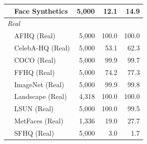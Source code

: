 \begin{table}[t]
\begin{tabular}{l l r r r}
  & Face Synthetics & 5,000 & 12.1 & 14.9 \\
\midrule
\multicolumn{5}{l}{\textit{Real}} \\
  & AFHQ (Real) & 5,000 & 100.0 & 100.0 \\
  & CelebA-HQ (Real) & 5,000 & 53.1 & 62.3 \\
  & COCO (Real) & 5,000 & 99.9 & 99.7 \\
  & FFHQ (Real) & 5,000 & 74.2 & 77.3 \\
  & ImageNet (Real) & 5,000 & 99.9 & 99.8 \\
  & Landscape (Real) & 4,318 & 100.0 & 100.0 \\
  & LSUN (Real) & 5,000 & 100.0 & 99.5 \\
  & MetFaces (Real) & 1,336 & 19.0 & 27.7 \\
  & SFHQ (Real) & 5,000 & 3.0 & 1.7 \\
\bottomrule
\end{tabular}
\end{table}